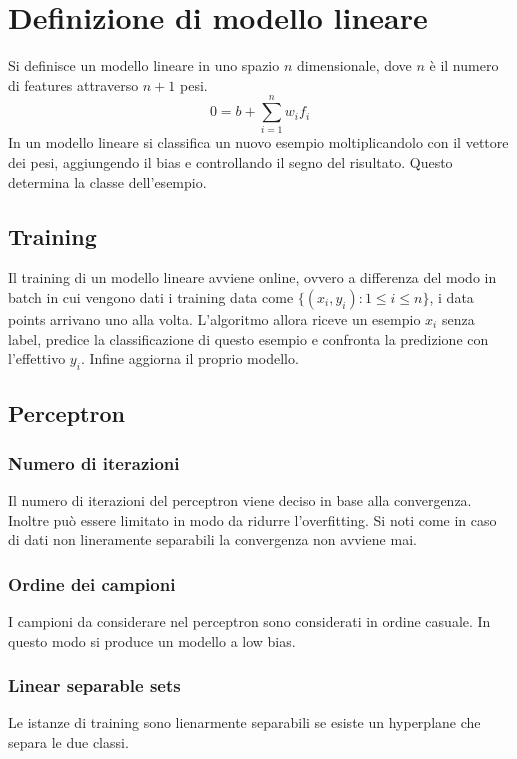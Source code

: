 \section{Definizione di modello lineare}
Si definisce un modello lineare in uno spazio $n$ dimensionale, dove $n$ \`e il numero di features attraverso $n+1$ pesi.
$$0=b+\sum\limits_{i=1}^nw_if_i$$
In un modello lineare si classifica un nuovo esempio moltiplicandolo con il vettore dei pesi, aggiungendo il bias e controllando il segno del risultato.
Questo determina la classe dell'esempio.

	\subsection{Training}
	Il training di un modello lineare avviene online, ovvero a differenza del modo in batch in cui vengono dati i training data come $\{(x_i, y_i):1\le i\le n\}$, i data points arrivano uno alla volta.
	L'algoritmo allora riceve un esempio $x_i$ senza label, predice la classificazione di questo esempio e confronta la predizione con l'effettivo $y_i$.
	Infine aggiorna il proprio modello.

	\subsection{Perceptron}

		\subsubsection{Numero di iterazioni}
		Il numero di iterazioni del perceptron viene deciso in base alla convergenza.
		Inoltre pu\`o essere limitato in modo da ridurre l'overfitting.
		Si noti come in caso di dati non lineramente separabili la convergenza non avviene mai.

		\subsubsection{Ordine dei campioni}
		I campioni da considerare nel perceptron sono considerati in ordine casuale.
		In questo modo si produce un modello a low bias.

		\subsubsection{Linear separable sets}
		Le istanze di training sono lienarmente separabili se esiste un hyperplane che separa le due classi.

